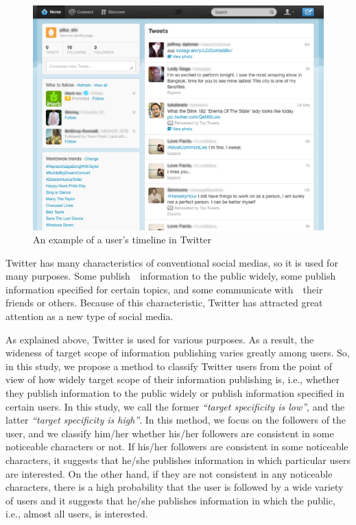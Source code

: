 {\footnotesize
\begin{figure}[t]
\begin{center}
\includegraphics[width=14cm]{images/screen_shot.eps}
 \caption{An example of a user's timeline in Twitter}
\label{fig:twitter}
\end{center}
\end{figure}
}

Twitter has many characteristics of conventional social medias, so it is
used for many purposes.  Some publish　information to the public widely,
some publish　information specified for certain topics, and some
communicate with　their friends or others.  Because of this
characteristic, Twitter has attracted great attention as a new type of
social media.

As explained above, Twitter is used for various purposes.  As a result,
the wideness of target scope of information publishing varies greatly
among users.  So, in this study, we propose a method to classify
Twitter users from the point of view of how widely target scope of
their information publishing is, i.e., whether they publish information
to the public widely or publish information specified in certain users.
In this study, we call the former \emph{``target specificity is
low''}, and the latter \emph{``target specificity is high''}. In this
method, we
focus on the followers of the user, and we classify him/her
whether his/her followers are consistent in some noticeable characters
or not.  If his/her followers are consistent in some noticeable
characters, it suggests that he/she publishes information in which
particular users are interested. On the other hand, if they are not
consistent in any noticeable characters, there is a high
probability that the user is followed by a wide variety of users and it
suggests that he/she publishes information in which the public, i.e.,
almost all users, is interested.


